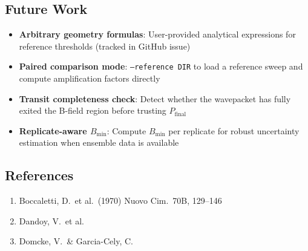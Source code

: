 \subsection{Future Work}
\label{sec:cf-future}

\begin{itemize}
  \item \textbf{Arbitrary geometry formulas}: User-provided analytical expressions for
    reference thresholds (tracked in GitHub issue)
  \item \textbf{Paired comparison mode}: \texttt{--reference DIR} to load a reference sweep and
    compute amplification factors directly
  \item \textbf{Transit completeness check}: Detect whether the wavepacket has fully
    exited the B-field region before trusting $P_\text{final}$
  \item \textbf{Replicate-aware $B_\text{min}$}: Compute $B_\text{min}$ per replicate for robust
    uncertainty estimation when ensemble data is available
\end{itemize}

\subsection{References}
\label{sec:critical-field-references}

\begin{enumerate}
  \item Boccaletti, D.\ et al.\ (1970) Nuovo Cim.\ 70B, 129--146
  \item Dandoy, V.\ et al.~\cite{dandoy2024constraining}
  \item Domcke, V.\ \& Garcia-Cely, C.~\cite{domcke2023simple}
\end{enumerate}
